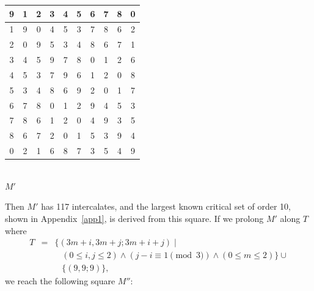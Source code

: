 \documentclass[12pt]{report}
\begin{document}
\begin{center}
\begin{tabular}{|c|c|c|c|c|c|c|c|c|c|}
\hline 9 & 1 & 2 & 3 & 4 & 5 & 6 & 7 & 8 & 0 \\
\hline 1 & 9 & 0 & 4 & 5 & 3 & 7 & 8 & 6 & 2 \\
\hline 2 & 0 & 9 & 5 & 3 & 4 & 8 & 6 & 7 & 1 \\
\hline 3 & 4 & 5 & 9 & 7 & 8 & 0 & 1 & 2 & 6 \\
\hline 4 & 5 & 3 & 7 & 9 & 6 & 1 & 2 & 0 & 8 \\
\hline 5 & 3 & 4 & 8 & 6 & 9 & 2 & 0 & 1 & 7 \\
\hline 6 & 7 & 8 & 0 & 1 & 2 & 9 & 4 & 5 & 3 \\
\hline 7 & 8 & 6 & 1 & 2 & 0 & 4 & 9 & 3 & 5 \\
\hline 8 & 6 & 7 & 2 & 0 & 1 & 5 & 3 & 9 & 4 \\
\hline 0 & 2 & 1 & 6 & 8 & 7 & 3 & 5 & 4 & 9 \\
\hline
\end{tabular}
\vspace{5mm}
\\ $M'$ \\
\end{center}


Then $M'$ has 117 intercalates, and the largest known critical set of
order 10, shown in Appendix~\ref{app1}, is derived from this square.  If we prolong $M'$ along $T$
where 
\begin{eqnarray*}
T &=& \{ ( 3m+i, 3m+j ; 3m+i+j) \mid \\
&& \;\;\; (0 \leq i,j \leq 2) \wedge (j - i \equiv 1 \pmod{3}) \wedge (0 \leq m \leq 2) \} \cup \\
&& \;\;\; \{ (9,9;9) \},
\end{eqnarray*}
we reach the following square $M''$:
\end{document}
